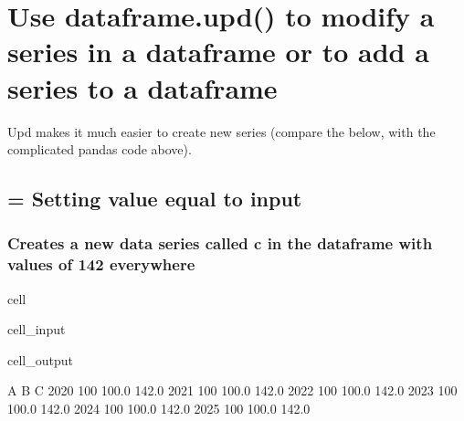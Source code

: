 \documentclass[letterpaper,10pt,english]{jupyterBook}
\begin{document}
\section{Use dataframe.upd()  to  modify a series in a dataframe or to add a series to a dataframe}
\label{\detokenize{content/howto/update/model update:use-dataframe-upd-to-modify-a-series-in-a-dataframe-or-to-add-a-series-to-a-dataframe}}
\sphinxAtStartPar
Upd makes it much easier to create new series (compare the below, with the complicated pandas code above).


\subsection{= Setting value equal to input}
\label{\detokenize{content/howto/update/model update:setting-value-equal-to-input}}

\subsubsection{Creates a new data series called c in the dataframe with values of 142 everywhere}
\label{\detokenize{content/howto/update/model update:creates-a-new-data-series-called-c-in-the-dataframe-with-values-of-142-everywhere}}
\begin{sphinxuseclass}{cell}\begin{sphinxVerbatimInput}

\begin{sphinxuseclass}{cell_input}
\begin{sphinxVerbatim}[commandchars=\\\{\}]
\end{sphinxVerbatim}

\end{sphinxuseclass}\end{sphinxVerbatimInput}
\begin{sphinxVerbatimOutput}

\begin{sphinxuseclass}{cell_output}
\begin{sphinxVerbatim}[commandchars=\\\{\}]
        A      B      C
2020  100  100.0  142.0
2021  100  100.0  142.0
2022  100  100.0  142.0
2023  100  100.0  142.0
2024  100  100.0  142.0
2025  100  100.0  142.0
\end{sphinxVerbatim}

\end{sphinxuseclass}\end{sphinxVerbatimOutput}

\end{sphinxuseclass}
\end{document}
